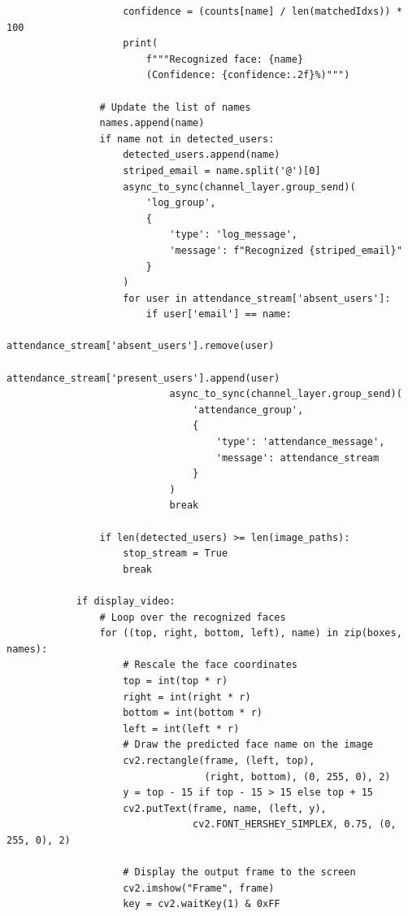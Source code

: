 \begin{itemize}
\begin{verbatim}
                    confidence = (counts[name] / len(matchedIdxs)) * 100
                    print(
                        f"""Recognized face: {name} 
                        (Confidence: {confidence:.2f}%)""")

                # Update the list of names
                names.append(name)
                if name not in detected_users:
                    detected_users.append(name)
                    striped_email = name.split('@')[0]
                    async_to_sync(channel_layer.group_send)(
                        'log_group',
                        {
                            'type': 'log_message',
                            'message': f"Recognized {striped_email}"
                        }
                    )
                    for user in attendance_stream['absent_users']:
                        if user['email'] == name:
                            attendance_stream['absent_users'].remove(user)
                            attendance_stream['present_users'].append(user)
                            async_to_sync(channel_layer.group_send)(
                                'attendance_group',
                                {
                                    'type': 'attendance_message',
                                    'message': attendance_stream
                                }
                            )
                            break

                if len(detected_users) >= len(image_paths):
                    stop_stream = True
                    break

            if display_video:
                # Loop over the recognized faces
                for ((top, right, bottom, left), name) in zip(boxes, names):
                    # Rescale the face coordinates
                    top = int(top * r)
                    right = int(right * r)
                    bottom = int(bottom * r)
                    left = int(left * r)
                    # Draw the predicted face name on the image
                    cv2.rectangle(frame, (left, top),
                                  (right, bottom), (0, 255, 0), 2)
                    y = top - 15 if top - 15 > 15 else top + 15
                    cv2.putText(frame, name, (left, y),
                                cv2.FONT_HERSHEY_SIMPLEX, 0.75, (0, 255, 0), 2)

                    # Display the output frame to the screen
                    cv2.imshow("Frame", frame)
                    key = cv2.waitKey(1) & 0xFF


\end{verbatim}
\end{itemize}
